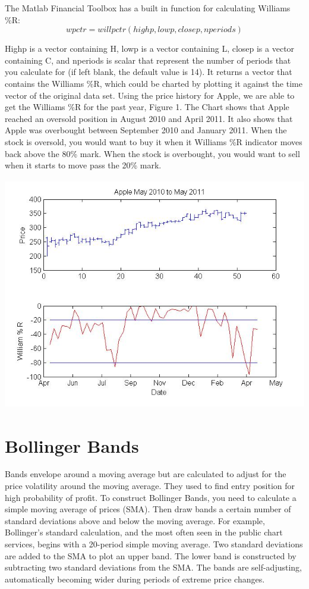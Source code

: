 \documentclass[12pt]{article}
\begin{document}
The Matlab Financial Toolbox has a built in function for calculating Williams \%R:
\[
		wpctr=willpctr(highp, lowp, closep, nperiods)
\]

Highp is a vector containing H, lowp is a vector containing L, closep is a vector containing C, and nperiods is scalar that represent the number of periods that you calculate for (if left blank, the default value is 14). It returns a vector that contains the Williams \%R, which could be charted by plotting it against the time vector of the original data set.
Using the price history for Apple, we are able to get the Williams \%R for the past year, Figure 1. The Chart shows that Apple reached an oversold position in August 2010 and April 2011. It also shows that Apple was overbought between September 2010 and January 2011. When the stock is oversold, you would want to buy it when it Williams \%R indicator moves back above the 80\% mark. When the stock is overbought, you would want to sell when it starts to move pass the 20\% mark.

\includegraphics[height=4in,width=5.5in]{apple.jpg}

\section{Bollinger Bands}
\hspace{6 mm}Bands envelope around a moving average but are calculated to adjust for the price volatility around the moving average. They used to find entry position for high probability of profit. To construct Bollinger Bands, you need to calculate a simple moving average of prices (SMA). Then draw bands a certain number of standard deviations above and below the moving average. For example, Bollinger's standard calculation, and the most often seen in the public chart services, begins with a 20-period simple moving average. Two standard deviations are added to the SMA to plot an upper band. The lower band is constructed by subtracting two standard deviations from the SMA. The bands are self-adjusting, automatically becoming wider during periods of extreme price changes.
\end{document}
